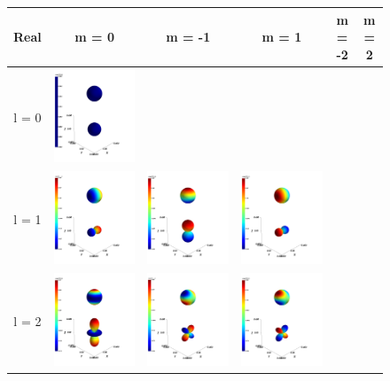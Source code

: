 \documentclass[10pt]{article}
\begin{document}
\begin{figure}[H]
    \centering
    \begin{tabular}{|c|c|c|c|c|c|}
    \hline
    \textbf{Real} & m = 0 & m = -1 & m = 1 & m = -2 & m = 2 \\ \hline
    l = 0 & \includegraphics[height=0.17\textwidth]{Figures/y00.png} &&&& \\ \hline
    l = 1 & \includegraphics[height=0.17\textwidth]{Figures/y1-1.png} &
    \includegraphics[height=0.17\textwidth]{Figures/y10.png} &
    \includegraphics[height=0.17\textwidth]{Figures/y11.png} && \\ \hline
    l = 2 & \includegraphics[height=0.17\textwidth]{Figures/y20.png} &
    \includegraphics[height=0.17\textwidth]{Figures/y2-1.png} &
    \includegraphics[height=0.17\textwidth]{Figures/y21.png} &

\end{tabular}
\end{figure}
\end{document}

